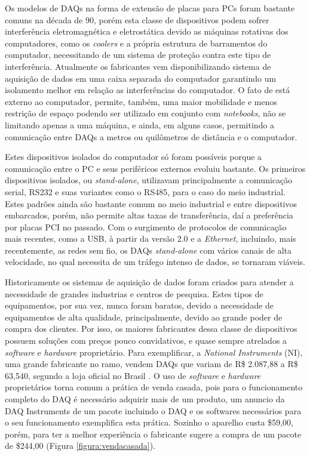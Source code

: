 Os modelos de DAQs na forma de extensão de placas para PCs foram bastante comuns na década de 90, porém esta classe de dispositivos podem sofrer interferência eletromagnética e eletrostática devido as máquinas rotativas dos computadores, como os \emph{coolers} e a própria estrutura de barramentos do computador, necessitando de um sistema de proteção contra este tipo de interferência. Atualmente os fabricantes vem disponibilizando sistema de aquisição de dados em uma caixa separada do computador garantindo um isolamento melhor em relação as interferências do computador. O fato de está externo ao computador, permite, também, uma maior mobilidade e menos restrição de espaço podendo ser utilizado em conjunto com \emph{notebooks}, não se limitando apenas a uma máquina, e ainda, em alguns casos, permitindo a comunicação entre DAQs a metros ou quilômetros de distância e o computador. 

Estes dispositivos isolados do computador só foram possíveis porque a comunicação entre o PC e seus periféricos externos evoluiu bastante. Os primeiros dispositivos isolados, ou \emph{stand-alone}, utilizavam principalmente a comunicação serial, RS232 e suas variantes como o RS485, para o caso do meio industrial. Estes padrões ainda são bastante comum no meio industrial e entre dispositivos embarcados, porém, não permite altas taxas de transferência, daí a preferência por placas PCI no passado. Com o surgimento de protocolos de comunicação mais recentes, como a USB, à partir da versão 2.0 e a \emph{Ethernet}, incluindo, mais recentemente, as redes sem fio, os DAQs \emph{stand-alone} com vários canais de alta velocidade, no qual necessita de um tráfego intenso de dados, se tornaram viáveis.

Historicamente os sistemas de aquisição de dados foram criados para atender a necessidade de grandes industrias e centros de pesquisa. Estes tipos de equipamentos, por sua vez, nunca foram baratos, devido a necessidade de equipamentos de alta qualidade, principalmente, devido ao grande poder de compra dos clientes. Por isso, os maiores fabricantes dessa classe de dispositivos possuem soluções com preços pouco convidativos, e quase sempre atrelados a \emph{software} e \emph{hardware} proprietário. Para exemplificar, a \emph{National Instruments} (NI), uma grande fabricante no ramo, vendem DAQs que variam de R\$ 2.087,88 a R\$ 63,540, segundo a loja oficial no Brasil \cite{lojanational}. O uso de \emph{software} e \emph{hardware} proprietários torna comum a prática de venda casada, pois para o funcionamento completo do DAQ é necessário adquirir mais de um produto, um anuncio da DAQ Instruments de um pacote incluindo o DAQ e os softwares necessários para o seu funcionamento exemplifica esta prática. Sozinho o aparelho custa \$59,00, porém, para ter a melhor experiência o fabricante sugere a compra de um pacote de \$244,00 (Figura \ref{figura:vendacasada}).

